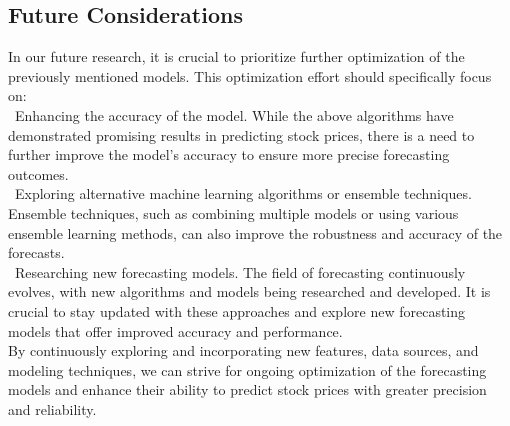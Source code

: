\documentclass{ieeeojies}
\begin{document}
\subsection{Future Considerations}
In our future research, it is crucial to prioritize further optimization of the previously mentioned models. This optimization effort should specifically focus on:\\
\indent\textbullet\ Enhancing the accuracy of the model. While the above algorithms have demonstrated promising results in predicting stock prices, there is a need to further improve the model's accuracy to ensure more precise forecasting outcomes.\\
\indent\textbullet\ Exploring alternative machine learning algorithms or ensemble techniques. Ensemble techniques, such as combining multiple models or using various ensemble learning methods, can also improve the robustness and accuracy of the forecasts.\\
\indent\textbullet\ Researching new forecasting models. The field of forecasting continuously evolves, with new algorithms and models being researched and developed. It is crucial to stay updated with these approaches and explore new forecasting models that offer improved accuracy and performance. \\
By continuously exploring and incorporating new features, data sources, and modeling techniques, we can strive for ongoing optimization of the forecasting models and enhance their ability to predict stock prices with greater precision and reliability.
\end{document}
